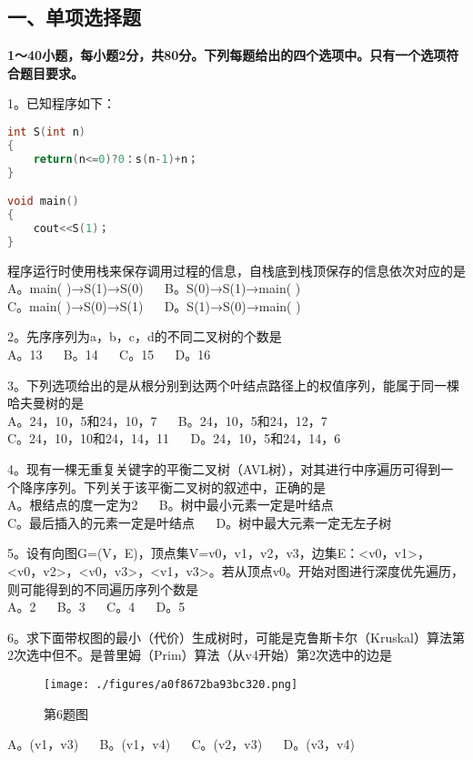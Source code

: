 
\subsection{一、单项选择题}
\textbf{1～40小题，每小题2分，共80分。下列每题给出的四个选项中。只有一个选项符合题目要求。}

1。已知程序如下： \\
\begin{lstlisting}[language=cpp]
int S(int n)
{
    return(n<=0)?0：s(n-1)+n；
}

void main()
{ 
    cout<<S(1)；
}
\end{lstlisting}
程序运行时使用栈来保存调用过程的信息，自栈底到栈顶保存的信息依次对应的是 \\
A。main( )→S(1)→S(0) $\quad$ B。S(0)→S(1)→main( ) \\
C。main( )→S(0)→S(1) $\quad$ D。S(1)→S(0)→main( )

2。先序序列为a，b，c，d的不同二叉树的个数是 \\
A。13 $\quad$ B。14 $\quad$ C。15 $\quad$ D。16

3。下列选项给出的是从根分别到达两个叶结点路径上的权值序列，能属于同一棵哈夫曼树的是 \\
A。24，10，5和24，10，7 $\quad$ B。24，10，5和24，12，7 \\
C。24，10，10和24，14，11 $\quad$ D。24，10，5和24，14，6

4。现有一棵无重复关键字的平衡二叉树（AVL树），对其进行中序遍历可得到一个降序序列。下列关于该平衡二叉树的叙述中，正确的是 \\
A。根结点的度一定为2 $\quad$ B。树中最小元素一定是叶结点 \\
C。最后插入的元素一定是叶结点 $\quad$ D。树中最大元素一定无左子树

5。设有向图G=(V，E)，顶点集V={v0，v1，v2，v3}，边集E：{<v0，v1>，<v0，v2>，<v0，v3>，<v1，v3>}。若从顶点v0。开始对图进行深度优先遍历，则可能得到的不同遍历序列个数是 \\
A。2 $\quad$ B。3 $\quad$ C。4 $\quad$ D。5

6。求下面带权图的最小（代价）生成树时，可能是克鲁斯卡尔（Kruskal）算法第2次选中但不。是普里姆（Prim）算法（从v4开始）第2次选中的边是
\begin{figure}[ht]
\centering
\texttt{[image: ./figures/a0f8672ba93bc320.png]}
\caption{第6题图} \label{fig_CSN15_1}
\end{figure}
A。(v1，v3) $\quad$ B。(v1，v4) $\quad$ C。(v2，v3) $\quad$ D。(v3，v4)

